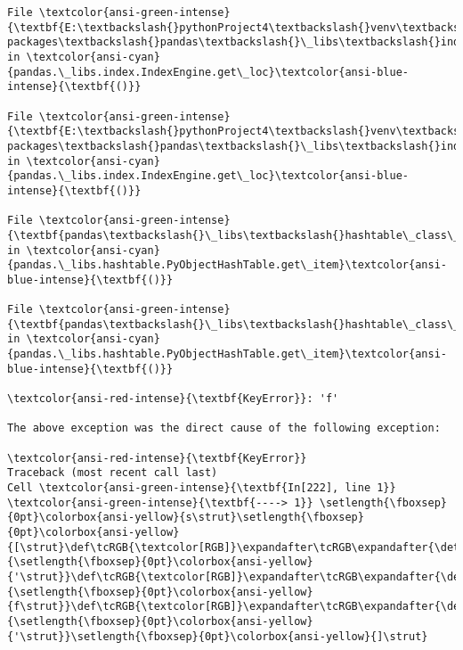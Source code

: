 \documentclass[11pt]{ctexart}
\begin{document}
\begin{Verbatim}[commandchars=\\\{\}, frame=single, framerule=2mm, rulecolor=\color{outerrorbackground}]
File \textcolor{ansi-green-intense}{\textbf{E:\textbackslash{}pythonProject4\textbackslash{}venv\textbackslash{}lib\textbackslash{}site-packages\textbackslash{}pandas\textbackslash{}\_libs\textbackslash{}index.pyx:147}}, in \textcolor{ansi-cyan}{pandas.\_libs.index.IndexEngine.get\_loc}\textcolor{ansi-blue-intense}{\textbf{()}}

File \textcolor{ansi-green-intense}{\textbf{E:\textbackslash{}pythonProject4\textbackslash{}venv\textbackslash{}lib\textbackslash{}site-packages\textbackslash{}pandas\textbackslash{}\_libs\textbackslash{}index.pyx:176}}, in \textcolor{ansi-cyan}{pandas.\_libs.index.IndexEngine.get\_loc}\textcolor{ansi-blue-intense}{\textbf{()}}

File \textcolor{ansi-green-intense}{\textbf{pandas\textbackslash{}\_libs\textbackslash{}hashtable\_class\_helper.pxi:7080}}, in \textcolor{ansi-cyan}{pandas.\_libs.hashtable.PyObjectHashTable.get\_item}\textcolor{ansi-blue-intense}{\textbf{()}}

File \textcolor{ansi-green-intense}{\textbf{pandas\textbackslash{}\_libs\textbackslash{}hashtable\_class\_helper.pxi:7088}}, in \textcolor{ansi-cyan}{pandas.\_libs.hashtable.PyObjectHashTable.get\_item}\textcolor{ansi-blue-intense}{\textbf{()}}

\textcolor{ansi-red-intense}{\textbf{KeyError}}: 'f'

The above exception was the direct cause of the following exception:

\textcolor{ansi-red-intense}{\textbf{KeyError}}                                  Traceback (most recent call last)
Cell \textcolor{ansi-green-intense}{\textbf{In[222], line 1}}
\textcolor{ansi-green-intense}{\textbf{----> 1}} \setlength{\fboxsep}{0pt}\colorbox{ansi-yellow}{s\strut}\setlength{\fboxsep}{0pt}\colorbox{ansi-yellow}{[\strut}\def\tcRGB{\textcolor[RGB]}\expandafter\tcRGB\expandafter{\detokenize{175,0,0}}{\setlength{\fboxsep}{0pt}\colorbox{ansi-yellow}{'\strut}}\def\tcRGB{\textcolor[RGB]}\expandafter\tcRGB\expandafter{\detokenize{175,0,0}}{\setlength{\fboxsep}{0pt}\colorbox{ansi-yellow}{f\strut}}\def\tcRGB{\textcolor[RGB]}\expandafter\tcRGB\expandafter{\detokenize{175,0,0}}{\setlength{\fboxsep}{0pt}\colorbox{ansi-yellow}{'\strut}}\setlength{\fboxsep}{0pt}\colorbox{ansi-yellow}{]\strut}


\end{Verbatim}
\end{document}
